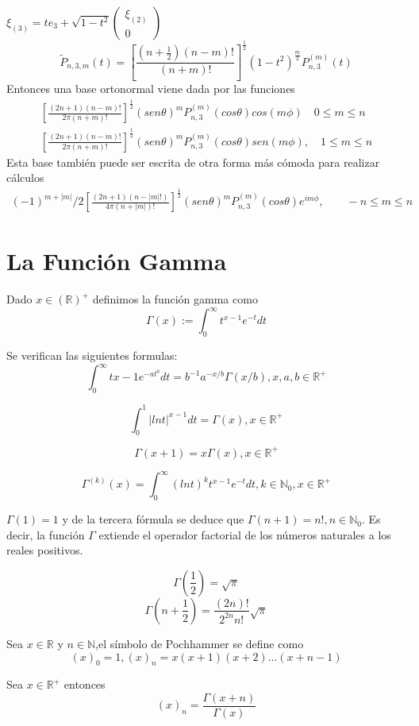 $ \xi_{(3)} = te_3 + \sqrt{1-t^2}\begin{pmatrix}
\xi_{(2)} \\
0
\end{pmatrix}$
$$ 
\tilde{P}_{n,3,m}(t)= \left[\frac{(n+\frac{1}{2})(n-m)!}{(n+m)!}\right]^\frac{1}{2} (1-t^2)^{\frac{m}{2}}P_{n,3}^{(m)}(t)
$$
Entonces una base ortonormal viene dada por las funciones
\begin{gather}
\left[\frac{(2n+1)(n-m)!}{2\pi(n+m)!}\right]^{\frac{1}{2}} (sen\theta)^{m}P_{n,3}^{(m)}(cos\theta)cos(m\phi) \quad 0 \le m \le n \\
\left[\frac{(2n+1)(n-m)!}{2\pi(n+m)!}\right]^{\frac{1}{2}} (sen\theta)^{m}P_{n,3}^{(m)}(cos\theta)sen(m\phi), \quad 1\le m \le n 
\end{gather}
Esta base también puede ser escrita de otra forma más cómoda para realizar cálculos
\begin{gather}
(-1)^{m+|m|}/2\left[\frac{(2n+1)(n-|m|!)}{4\pi(n+|m|)!}\right]^{\frac{1}{2}} (sen \theta)^m P_{n,3}^{(m)}(cos\theta)e^{im\phi}, \qquad -n\le m \le n
\end{gather}

\appendix
\chapter{La Función Gamma}\label{aped.A}
\begin{defn} Dado $x\in\mathds{(R)^+}$ definimos la función gamma como
	$$
	\Gamma(x) := \int_{0}^{\infty} t^{x-1}e^{-t}dt		
	$$
\end{defn}
\begin{prop}Se verifican las siguientes formulas:
	$$
	\int_{0}^{\infty}  t{x-1}e^{-at^b}dt = b^{-1}a^{-x/b}\Gamma(x/b)  , x,a,b \in \mathds{R}^+
	$$
	
	$$
	\int_{0}^{1} |ln t|^{x-1}dt = \Gamma(x),   x \in \mathds{R}^+
	$$
	
	$$
	\Gamma(x+1) = x \Gamma(x) ,		x\in \mathds{R}^+
	$$
	
	$$
	\Gamma^{(k)}(x) = \int_{0}^{\infty} (ln t)^k t^{x-1} e^{-t} dt,   k\in\mathds{N}_0,x\in\mathds{R}^+
	$$
\end{prop}
\begin{rem}
	$\Gamma(1)=1$ y de la tercera fórmula se deduce que $\Gamma(n+1)=n!, n\in\mathds{N}_0$. Es decir, la función $\Gamma$ extiende el operador factorial de los números naturales a los reales positivos.
\end{rem}
\begin{lem} 
	$$
	\Gamma(\frac{1}{2}) = 	\sqrt{\pi}
	$$
	$$
	\Gamma(n+\frac{1}{2})=\frac{(2n)!}{2^{2n}n!} \sqrt{\pi}
	$$
\end{lem}
\begin{defn}Sea $x\in\mathds{R}$ y $n\in\mathds{N}$,el símbolo de Pochhammer se define como
	$$
	(x)_0 = 1, (x)_n=x(x+1)(x+2)...(x+n-1)
	$$
\end{defn}
\begin{prop} Sea $x\in\mathds{R}^+$ entonces
	$$
	(x)_n = \frac{\Gamma(x+n)}{\Gamma(x)}
	$$
\end{prop}

